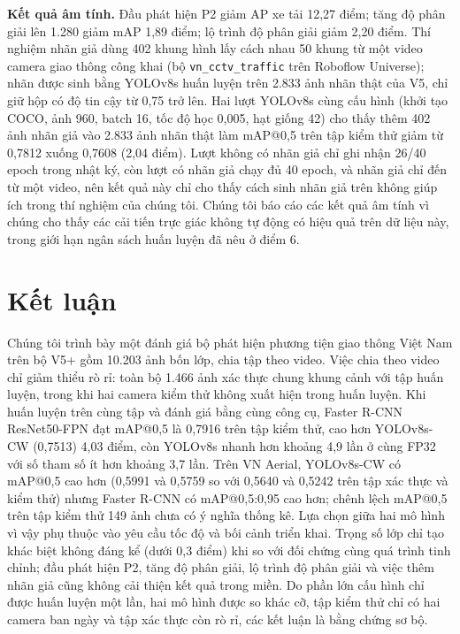 \documentclass[10pt,journal,a4paper]{IEEEtran}
\begin{document}
\textbf{Kết quả âm tính.} Đầu phát hiện P2 giảm AP xe tải 12,27 điểm; tăng độ phân giải lên 1.280 giảm mAP 1,89 điểm; lộ trình độ phân giải giảm 2,20 điểm. Thí nghiệm nhãn giả dùng 402 khung hình lấy cách nhau 50 khung từ một video camera giao thông công khai (bộ \texttt{vn\_cctv\_traffic} trên Roboflow Universe); nhãn được sinh bằng YOLOv8s huấn luyện trên 2.833 ảnh nhãn thật của V5, chỉ giữ hộp có độ tin cậy từ 0,75 trở lên. Hai lượt YOLOv8s cùng cấu hình (khởi tạo COCO, ảnh 960, batch 16, tốc độ học 0,005, hạt giống 42) cho thấy thêm 402 ảnh nhãn giả vào 2.833 ảnh nhãn thật làm mAP@0,5 trên tập kiểm thử giảm từ 0,7812 xuống 0,7608 (2,04 điểm). Lượt không có nhãn giả chỉ ghi nhận 26/40 epoch trong nhật ký, còn lượt có nhãn giả chạy đủ 40 epoch, và nhãn giả chỉ đến từ một video, nên kết quả này chỉ cho thấy cách sinh nhãn giả trên không giúp ích trong thí nghiệm của chúng tôi. Chúng tôi báo cáo các kết quả âm tính vì chúng cho thấy các cải tiến trực giác không tự động có hiệu quả trên dữ liệu này, trong giới hạn ngân sách huấn luyện đã nêu ở điểm 6.

\section{Kết luận}
Chúng tôi trình bày một đánh giá bộ phát hiện phương tiện giao thông Việt Nam trên bộ V5+ gồm 10.203 ảnh bốn lớp, chia tập theo video. Việc chia theo video chỉ giảm thiểu rò rỉ: toàn bộ 1.466 ảnh xác thực chung khung cảnh với tập huấn luyện, trong khi hai camera kiểm thử không xuất hiện trong huấn luyện. Khi huấn luyện trên cùng tập và đánh giá bằng cùng công cụ, Faster R-CNN ResNet50-FPN đạt mAP@0,5 là 0,7916 trên tập kiểm thử, cao hơn YOLOv8s-CW (0,7513) 4,03 điểm, còn YOLOv8s nhanh hơn khoảng 4,9 lần ở cùng FP32 với số tham số ít hơn khoảng 3,7 lần. Trên VN Aerial, YOLOv8s-CW có mAP@0,5 cao hơn (0,5991 và 0,5759 so với 0,5640 và 0,5242 trên tập xác thực và kiểm thử) nhưng Faster R-CNN có mAP@0,5:0,95 cao hơn; chênh lệch mAP@0,5 trên tập kiểm thử 149 ảnh chưa có ý nghĩa thống kê. Lựa chọn giữa hai mô hình vì vậy phụ thuộc vào yêu cầu tốc độ và bối cảnh triển khai. Trọng số lớp chỉ tạo khác biệt không đáng kể (dưới 0,3 điểm) khi so với đối chứng cùng quá trình tinh chỉnh; đầu phát hiện P2, tăng độ phân giải, lộ trình độ phân giải và việc thêm nhãn giả cũng không cải thiện kết quả trong miền. Do phần lớn cấu hình chỉ được huấn luyện một lần, hai mô hình được so khác cỡ, tập kiểm thử chỉ có hai camera ban ngày và tập xác thực còn rò rỉ, các kết luận là bằng chứng sơ bộ.
\end{document}
